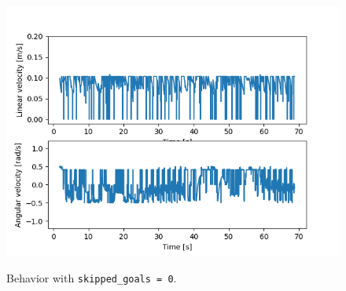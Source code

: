 \documentclass[11pt,a4paper]{article}
\begin{document}
\begin{figure}[H]
{        \includegraphics[scale=0.5]{different_params/dwa_skippedgoals0/Linear_and_Angular_Velocities.png}
    }
    \caption[]{Behavior with \texttt{skipped\_goals = 0}.}
\end{figure}
\end{document}
